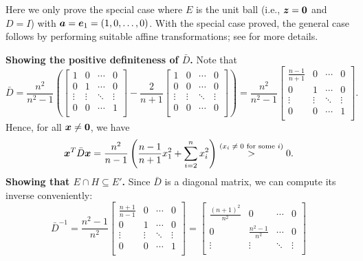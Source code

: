 \begin{enumerate}
\begin{pf}
Here we only prove the special case where \(E\) is the unit ball (i.e.,
\(\bm{z}=\bm{0}\) and \(D=I\)) with
\(\bm{a}=\bm{e}_1=(1,0,\dotsc,0)\). With the special case proved, the
general case follows by performing suitable affine transformations; see
\textcite[Theorem~8.1]{bertsimas1997introduction} for more details.

\textbf{Showing the positive definiteness of \(\bar{D}\).}
Note that
\[
\bar{D}=\frac{n^{2}}{n^{2}-1}\left(
\begin{bmatrix}1&0&\cdots&0\\
0&1&\cdots&0\\
\vdots&\vdots&\ddots&\vdots \\
0&0&\cdots&1\\
\end{bmatrix}
-\frac{2}{n+1}
\begin{bmatrix}1&0&\cdots&0\\
0&0&\cdots&0\\
\vdots&\vdots&\ddots&\vdots \\
0&0&\cdots&0\\
\end{bmatrix}\right)
=\frac{n^{2}}{n^{2}-1}
\begin{bmatrix}\frac{n-1}{n+1}&0&\cdots&0\\
0&1&\cdots&0\\
\vdots&\vdots&\ddots&\vdots \\
0&0&\cdots&1\\
\end{bmatrix}.
\]
Hence, for all \(\bm{x}\ne\bm{0}\), we have
\[
\bm{x}^{T}\bar{D}\bm{x}=\frac{n^{2}}{n-1}\left(\frac{n-1}{n+1}x_1^{2}
+\sum_{i=2}^{n}x_i^{2}\right)
\overset{\text{(\(x_i\ne 0\) for some \(i\))}}{>}0.
\]
\textbf{Showing that \(E\cap H\subseteq E'\).}
Since \(\bar{D}\) is a diagonal matrix, we can compute its inverse conveniently:
\[
\bar{D}^{-1}=\frac{n^{2}-1}{n^{2}}
\begin{bmatrix}\frac{n+1}{n-1}&0&\cdots&0\\
0&1&\cdots&0\\
\vdots&\vdots&\ddots&\vdots \\
0&0&\cdots&1\\
\end{bmatrix}
=\begin{bmatrix}\frac{(n+1)^{2}}{n^{2}}&0&\cdots&0\\
0&\frac{n^{2}-1}{n^{2}}&\cdots&0\\
\vdots&\vdots&\ddots&\vdots \\

\end{bmatrix}\]
\end{pf}
\end{enumerate}
